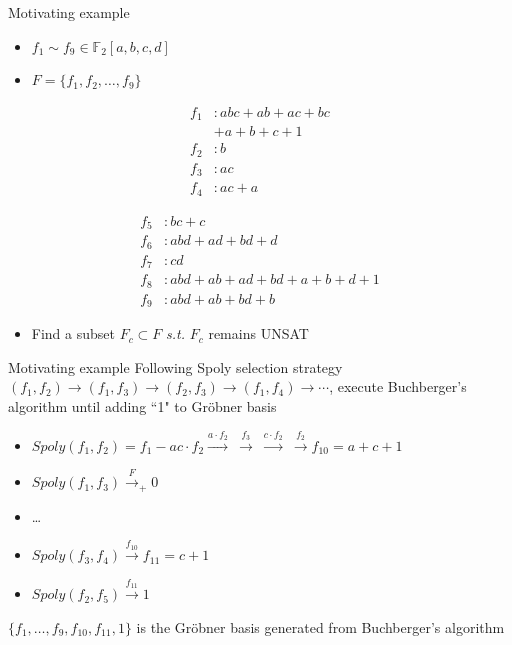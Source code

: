 \documentclass[xcolor=dvipsnames]{beamer}
\newcommand{\bi}{\begin{itemize}}
\newcommand{\ei}{\end{itemize}}
\begin{document}
\begin{frame}{\large{Motivating example}}
\bi
\item $f_1\sim f_9 \in \mathbb{F}_2[a,b,c,d]$
\item $F = \{f_1,f_2,\dots,f_9\}$
\ei

\begin{minipage}{2in}
\begin{align*}
f_1&: abc + ab + ac + bc \\
   & + a + b + c + 1\\
f_2&: b\\
f_3&: ac\\
f_4&: ac + a
\end{align*}
\end{minipage}
\begin{minipage}{2in}
\begin{align*}
f_5&: bc + c\\
f_6&: abd + ad + bd + d\\
f_7&: cd\\
f_8&: abd + ab + ad + bd + a + b + d + 1\\
f_9&: abd + ab +bd + b
\end{align*}
\end{minipage}
\vspace{1cm}
\bi
\item Find a subset $F_c \subset F$ {\it s.t.} $F_c$ remains UNSAT 
\ei
\end{frame}
\begin{frame}{\large{Motivating example}}
Following Spoly selection strategy $(f_1,f_2)\to (f_1,f_3) \to (f_2,f_3)\to (f_1,f_4) \to \cdots$,
execute Buchberger's algorithm until adding ``1" to Gr\"obner basis
\bi
\item $Spoly(f_1,f_2)= f_1 - ac\cdot f_2\xrightarrow{a\cdot f_2} ~\xrightarrow{f_3}~
\xrightarrow{c\cdot f_2}  ~\xrightarrow{f_2} f_{10}=a+c+1$
\item $Spoly(f_1,f_3)\xrightarrow{F}_+ 0$
\item \dots
\item $Spoly(f_3,f_4)\xrightarrow{f_{10}} f_{11} = c+1$
\item $Spoly(f_2,f_5)\xrightarrow{f_{11}} 1$
\ei
$\{f_1,\dots,f_9,f_{10},f_{11},1\}$ is the Gr\"obner basis generated from Buchberger's algorithm
\end{frame}

\end{document}
